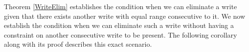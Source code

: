     

    

    Theorem \ref{WriteElim} establishes the condition when we can eliminate a write given that there exists another write with equal range consecutive to it.
    We now establish the condition when we can eliminate such a write without having a constraint on another consecutive write to be present. 
    The following corollary along with its proof describes this exact scenario.

    